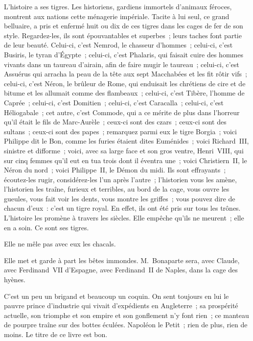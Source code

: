 \documentclass[french,twoside]{book} %
\begin{document}
L’histoire a ses tigres. Les historiens, gardiens immortels d’animaux féroces, montrent aux nations cette ménagerie impériale. Tacite à lui seul, ce grand belluaire, a pris et enfermé huit ou dix de ces tigres dans les cages de fer de son style. Regardez-les, ils sont épouvantables et superbes ; leurs taches font partie de leur beauté. Celui-ci, c’est Nemrod, le chasseur d’hommes ; celui-ci, c’est Busiris, le tyran d’Égypte ; celui-ci, c’est Phalaris, qui faisait cuire des hommes vivants dans un taureau d’airain, afin de faire mugir le taureau ; celui-ci, c’est Assuérus qui arracha la peau de la tête aux sept Macchabées et les fit rôtir vifs ; celui-ci, c’est Néron, le brûleur de Rome, qui enduisait les chrétiens de cire et de bitume et les allumait comme des flambeaux ; celui-ci, c’est Tibère, l’homme de Caprée ; celui-ci, c’est Domitien ; celui-ci, c’est Caracalla ; celui-ci, c’est Héliogabale ; cet autre, c’est Commode, qui a ce mérite de plus dans l’horreur qu’il était le fils de Marc-Aurèle ; ceux-ci sont des czars ; ceux-ci sont des sultans ; ceux-ci sont des papes ; remarquez parmi eux le tigre Borgia ; voici Philippe dit le Bon, comme les furies étaient dites Euménides ; voici Richard III, sinistre et difforme ; voici, avec sa large face et son gros ventre, Henri VIII, qui sur cinq femmes qu’il eut en tua trois dont il éventra une ; voici Christiern II, le Néron du nord ; voici Philippe II, le Démon du midi. Ils sont effrayants ; écoutez-les rugir, considérez-les l’un après l’autre ; l’historien vous les amène, l’historien les traîne, furieux et terribles, au bord de la cage, vous ouvre les gueules, vous fait voir les dents, vous montre les griffes ; vous pouvez dire de chacun d’eux : c’est un tigre royal. En effet, ils ont été pris sur tous les trônes. L’histoire les promène à travers les siècles. Elle empêche qu’ils ne meurent ; elle en a soin. Ce sont ses tigres.\par
Elle ne mêle pas avec eux les chacals.\par
Elle met et garde à part les bêtes immondes. M. Bonaparte sera, avec Claude, avec Ferdinand VII d’Espagne, avec Ferdinand II de Naples, dans la cage des hyènes.\par
C’est un peu un brigand et beaucoup un coquin. On sent toujours en lui le pauvre prince d’industrie qui vivait d’expédients en Angleterre ; sa prospérité actuelle, son triomphe et son empire et son gonflement n’y font rien ; ce manteau de pourpre traîne sur des bottes éculées. Napoléon le Petit ; rien de plus, rien de moins. Le titre de ce livre est bon.\par
\end{document}
